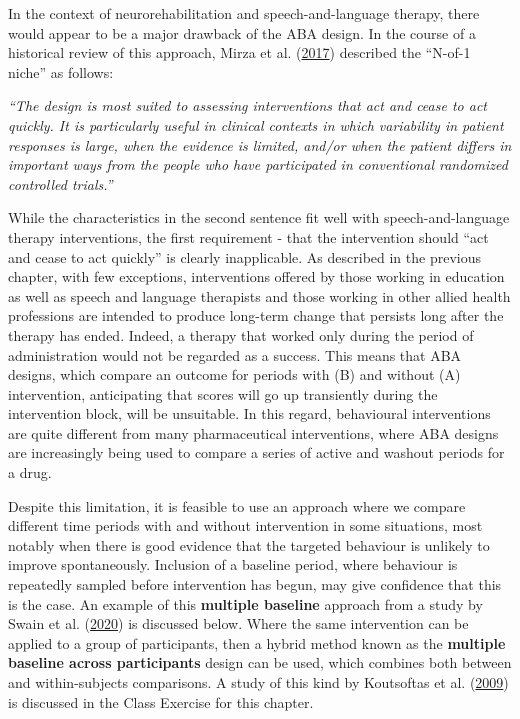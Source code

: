 \documentclass{krantz}
\begin{document}
In the context of neurorehabilitation and speech-and-language therapy, there would appear to be a major drawback of the ABA design. In the course of a historical review of this approach, Mirza et al. (\protect\hyperlink{ref-mirza2017}{2017}) described the ``N-of-1 niche'' as follows:

\emph{``The design is most suited to assessing interventions that act and cease to act quickly. It is particularly useful in clinical contexts in which variability in patient responses is large, when the evidence is limited, and/or when the patient differs in important ways from the people who have participated in conventional randomized controlled trials.''}

While the characteristics in the second sentence fit well with speech-and-language therapy interventions, the first requirement - that the intervention should ``act and cease to act quickly'' is clearly inapplicable. As described in the previous chapter, with few exceptions, interventions offered by those working in education as well as speech and language therapists and those working in other allied health professions are intended to produce long-term change that persists long after the therapy has ended. Indeed, a therapy that worked only during the period of administration would not be regarded as a success. This means that ABA designs, which compare an outcome for periods with (B) and without (A) intervention, anticipating that scores will go up transiently during the intervention block, will be unsuitable. In this regard, behavioural interventions are quite different from many pharmaceutical interventions, where ABA designs are increasingly being used to compare a series of active and washout periods for a drug.

Despite this limitation, it is feasible to use an approach where we compare different time periods with and without intervention in some situations, most notably when there is good evidence that the targeted behaviour is unlikely to improve spontaneously. Inclusion of a baseline period, where behaviour is repeatedly sampled before intervention has begun, may give confidence that this is the case. An example of this \textbf{multiple baseline} approach from a study by Swain et al. (\protect\hyperlink{ref-swain2020}{2020}) is discussed below. Where the same intervention can be applied to a group of participants, then a hybrid method known as the \textbf{multiple baseline across participants} design can be used, which combines both between and within-subjects comparisons. A study of this kind by Koutsoftas et al. (\protect\hyperlink{ref-koutsoftas2009}{2009}) is discussed in the Class Exercise for this chapter.
\end{document}
